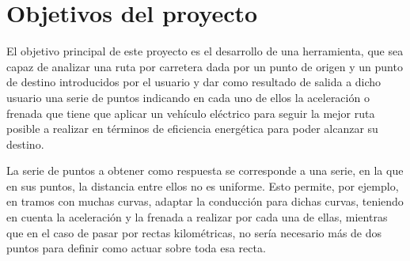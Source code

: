 \documentclass[11pt,spanish,listoffigures,listoftables]{tfgetsinf}
\begin{document}
\section{Objetivos del proyecto}
El objetivo principal de este proyecto es el desarrollo de una herramienta, que sea capaz de analizar una ruta por carretera dada por un punto de origen y un punto de destino introducidos por el usuario y dar como resultado de salida a dicho usuario una serie de puntos indicando en cada uno de ellos la aceleración o frenada que tiene que aplicar un vehículo eléctrico para seguir la mejor ruta posible a realizar en términos de eficiencia energética para poder alcanzar su destino.

La serie de puntos a obtener como respuesta se corresponde a una serie, en la que en sus puntos, la distancia entre ellos no es uniforme. Esto permite, por ejemplo, en tramos con muchas curvas, adaptar la conducción para dichas curvas, teniendo en cuenta la aceleración y la frenada a realizar por cada una de ellas, mientras que en el caso de pasar por rectas kilométricas, no sería necesario más de dos puntos para definir como actuar sobre toda esa recta.
\end{document}
